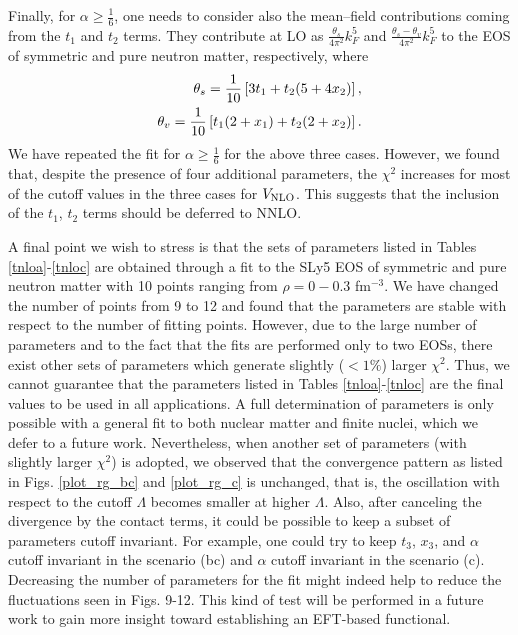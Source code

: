 \documentclass[aps,11pt,prc,preprint,superscriptaddress,nofootinbib]{revtex4}
\begin{document}
Finally, for $\alpha \geq \frac{1}{6}$, one needs to consider also the mean--field
contributions coming from the $t_1$ and $t_2$ terms. They contribute at LO as $\frac{\theta _{s}}{4\pi
^{2}}k_{F}^{5}$ and $\frac{\theta _{s}-\theta_{v}}{4\pi
^{2}}k_{F}^{5}$ to the EOS of symmetric and pure neutron matter, respectively, where 
\begin{eqnarray}
\theta _{s}=\frac{1}{10}\left[ 3t_{1}+t_{2}(5+4x_{2})\right], \notag \\
 \theta _{v}=\frac{1}{10}\left[ t_{1}(2+x_1)+t_{2}(2+x_{2})\right].
\end{eqnarray}%
We have repeated the fit for $\alpha \geq \frac{1}{6}$ for the above three cases. However, we found
that, despite the presence of four additional parameters, the $\chi ^{2}$  increases for most of the cutoff values in the three
cases for $V_{\rm NLO}$. This suggests that the inclusion of the $t_{1}$, $t_{2}$ terms
should be deferred to NNLO.

A final point we wish to stress is that the sets of parameters listed in Tables \ref{tnloa}-\ref{tnloc} are obtained through a fit to the SLy5 EOS of symmetric and pure neutron matter with 10 points ranging from $\rho=0-0.3$ fm$^{-3}$. We have changed the number of points from 9 to 12 and found that the parameters are stable with respect to the number of fitting points. However, due to the large number of parameters and to the fact that the fits are performed only to two EOSs, there exist other sets of parameters which generate slightly ($<1\%$) larger $\chi^2$. Thus, we cannot guarantee that the parameters listed in Tables \ref{tnloa}-\ref{tnloc} are the final values to be used in all applications. A full determination of parameters is only possible with a general fit to both nuclear matter and finite nuclei, which we defer to a future work. Nevertheless, when another set of parameters (with slightly larger $\chi^2$) is adopted, we observed that the convergence pattern as listed in Figs. \ref{plot_rg_bc} and \ref{plot_rg_c} is unchanged, that is, the oscillation with respect to the cutoff $\Lambda$ becomes smaller at higher $\Lambda$. Also, after canceling the divergence by the contact terms, it could be possible to keep a subset of 
parameters cutoff invariant. For example, one could try to keep $t_3$, $x_3$, and $\alpha$ cutoff invariant 
in the scenario (bc) and $\alpha$ cutoff invariant in the scenario (c). Decreasing the number of parameters for the fit might indeed help to reduce the fluctuations seen in Figs. 9-12. This kind of test will be performed in a future work to gain more insight toward establishing an EFT-based functional.
\end{document}
